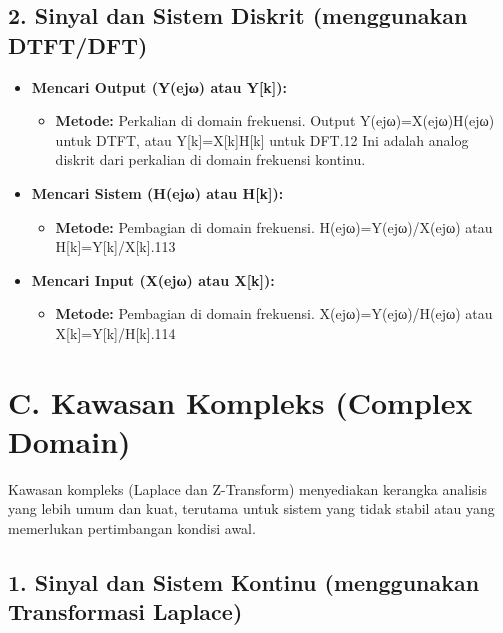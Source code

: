 \documentclass[
  letterpaper,
  DIV=11,
  numbers=noendperiod]{scrreprt}
\providecommand{\tightlist}{%
  \setlength{\itemsep}{0pt}\setlength{\parskip}{0pt}}\usepackage{longtable,booktabs,array}
\begin{document}
\subsection{2. Sinyal dan Sistem Diskrit (menggunakan
DTFT/DFT)}\label{sinyal-dan-sistem-diskrit-menggunakan-dtftdft}

\begin{itemize}
\item
  \textbf{Mencari Output (Y(ejω) atau Y{[}k{]}):}

  \begin{itemize}
  \tightlist
  \item
    \textbf{Metode:} Perkalian di domain frekuensi. Output
    Y(ejω)=X(ejω)H(ejω) untuk DTFT, atau Y{[}k{]}=X{[}k{]}H{[}k{]} untuk
    DFT.12 Ini adalah analog diskrit dari perkalian di domain frekuensi
    kontinu.
  \end{itemize}
\item
  \textbf{Mencari Sistem (H(ejω) atau H{[}k{]}):}

  \begin{itemize}
  \tightlist
  \item
    \textbf{Metode:} Pembagian di domain frekuensi. H(ejω)=Y(ejω)/X(ejω)
    atau H{[}k{]}=Y{[}k{]}/X{[}k{]}.113
  \end{itemize}
\item
  \textbf{Mencari Input (X(ejω) atau X{[}k{]}):}

  \begin{itemize}
  \tightlist
  \item
    \textbf{Metode:} Pembagian di domain frekuensi. X(ejω)=Y(ejω)/H(ejω)
    atau X{[}k{]}=Y{[}k{]}/H{[}k{]}.114
  \end{itemize}
\end{itemize}

\section{C. Kawasan Kompleks (Complex
Domain)}\label{c.-kawasan-kompleks-complex-domain-1}

Kawasan kompleks (Laplace dan Z-Transform) menyediakan kerangka analisis
yang lebih umum dan kuat, terutama untuk sistem yang tidak stabil atau
yang memerlukan pertimbangan kondisi awal.

\subsection{1. Sinyal dan Sistem Kontinu (menggunakan Transformasi
Laplace)}\label{sinyal-dan-sistem-kontinu-menggunakan-transformasi-laplace}
\end{document}
